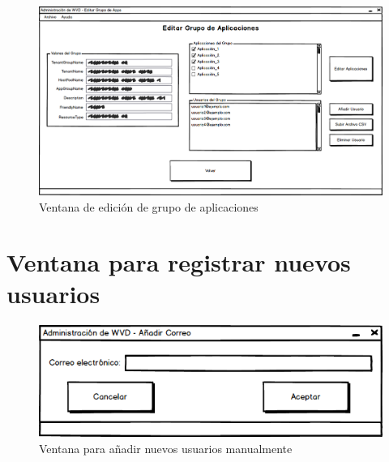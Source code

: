 \begin{figure}[h]
  \centering
  \includegraphics[width=0.9\linewidth]{figures/images/bocetos/editar_infogrupo.png}
  \caption{Ventana de edición de grupo de aplicaciones}
  \label{fig:b_editgrupo}
\end{figure}


\section{Ventana para registrar nuevos usuarios}

\begin{figure}[h]
  \centering
  \includegraphics[width=0.7\linewidth]{figures/images/bocetos/add_correos.png}
  \caption{Ventana para añadir nuevos usuarios manualmente}
  \label{fig:b_adduser}
\end{figure}